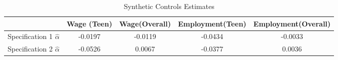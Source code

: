 \begin{table}[htbp]\centering
\caption{Synthetic Controls Estimates}
\begin{tabular}{l*{4}{c}}
\toprule
            & Wage (Teen)&Wage(Overall)&Employment(Teen)&Employment(Overall)\\
\midrule
Specification 1 $\hat{\alpha}$&     -0.0197&     -0.0119&     -0.0434&     -0.0033\\
Specification 2 $\hat{\alpha}$&     -0.0526&      0.0067&     -0.0377&      0.0036\\
\bottomrule
\end{tabular}
\end{table}
